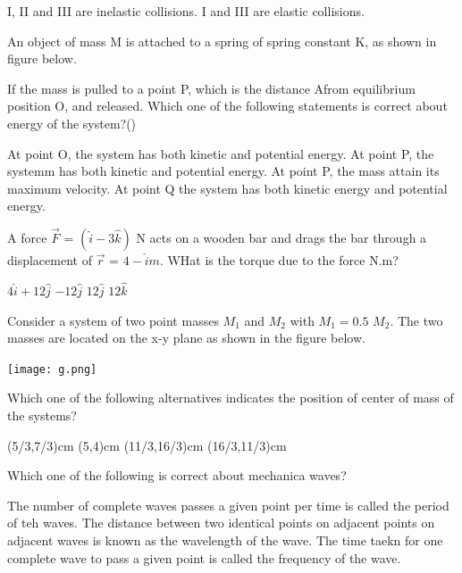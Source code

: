 \documentclass[12pt,addpoints]{exam}
\begin{document}
\begin{questions}
\begin{choices}
			\choice I, II and III are inelastic collisions.
			\choice I and III are elastic collisions.
		\end{choices}
		\question An object of mass M is attached to a spring of spring constant K, as shown in figure below.
		\begin{center}
		\end{center} 
		If the mass is pulled to a point P, which is the distance Afrom equilibrium position O, and released. Which one of the following statements is correct about energy of the system?() \\
		\begin{choices}
			\choice At point O, the system has both kinetic and potential energy.
			\choice At point P, the systemm has both kinetic and potential energy.
			\choice At point P, the mass attain its maximum velocity.
			\choice At point Q the system has both kinetic energy and potential energy.
		\end{choices}
		\question A force $\vec{F}$ = $(\hat{i}-3\hat{k})$ N acts on a wooden bar and drags the bar through a displacement of $\vec{r}$ = $4-\hat{i}m$. WHat is the torque due to the force N.m?  \\ 
		\begin{oneparchoices}
			\choice $4\hat{i}+12\hat{j}$
			\choice $-12\hat{j}$
			\choice $12\hat{j}$
			\choice $12\hat{k}$
		\end{oneparchoices}
		\question Consider a system of two point masses $M_1$ and $M_2$ with $M_1 = 0.5$ $M_2$. The two masses are located on the x-y plane as shown in the figure below. 
		\begin{center}
			\texttt{[image: g.png]}
		\end{center} 
		Which one of the following alternatives indicates the position of center of mass of the systems? \\
		\begin{oneparchoices}
			\choice(5/3,7/3)cm
			\choice (5,4)cm
			\choice(11/3,16/3)cm
			\choice (16/3,11/3)cm
		\end{oneparchoices}
		\question Which one of the following is correct about mechanica waves? \\
		\begin{choices}
			\choice The number of complete waves passes a given point per time is called the period of teh waves.
			\choice The distance between two identical points on adjacent points on adjacent waves is known as the wavelength of the wave.
			\choice The time taekn for one complete wave to pass a given point is called the frequency of the wave.

\end{choices}
\end{questions}
\end{document}
